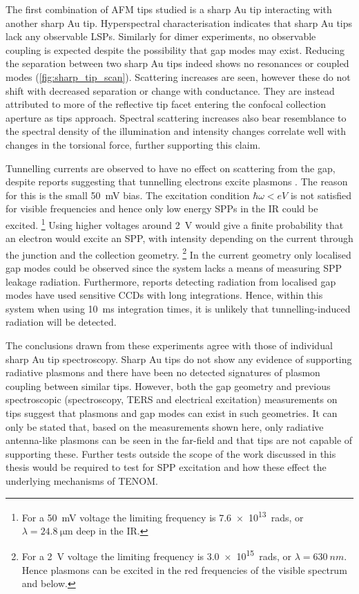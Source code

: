 \documentclass[a4paper]{article}
\begin{document}
The first combination of AFM tips studied is a sharp Au tip interacting with another sharp Au tip. Hyperspectral characterisation indicates that sharp Au tips lack any observable LSPs. Similarly for dimer experiments, no observable coupling is expected despite the possibility that gap modes may exist. Reducing the separation between two sharp Au tips indeed shows no resonances or coupled modes (\autoref{fig:sharp_tip_scan}). Scattering increases are seen, however these do not shift with decreased separation or change with conductance. They are instead attributed to more of the reflective tip facet entering the confocal collection aperture as tips approach. Spectral scattering increases also bear resemblance to the spectral density of the illumination and intensity changes correlate well with changes in the torsional force, further supporting this claim.

Tunnelling currents are observed to have no effect on scattering from the gap, despite reports suggesting that tunnelling electrons excite plasmons \cite{lambe1976, berndt1991, bharadwaj2011, wang2011, divitt2013, ye2014}. The reason for this is the small \SI{50}{mV} bias. The excitation condition $\hbar\omega<eV$ is not satisfied for visible frequencies and hence only low energy SPPs in the IR could be excited.%
\footnote{For a \SI{50}{mV} voltage the limiting frequency is \SI{7.6e13}{rads}, or $\lambda=\SI{24.8}{\micro\metre}$ deep in the IR.}
Using higher voltages around \SI{2}{V} would give a finite probability that an electron would excite an SPP, with intensity depending on the current through the junction and the collection geometry.%
\footnote{For a \SI{2}{V} voltage the limiting frequency is \SI{3.0e15}{rads}, or $\lambda=\SI{630}{nm}$. Hence plasmons can be excited in the red frequencies of the visible spectrum and below.}
In the current geometry only localised gap modes could be observed since the system lacks a means of measuring SPP leakage radiation. Furthermore, reports detecting radiation from localised gap modes have used sensitive CCDs with long integrations. Hence, within this system when using \SI{10}{ms} integration times, it is unlikely that tunnelling-induced radiation will be detected.

The conclusions drawn from these experiments agree with those of individual sharp Au tip spectroscopy. Sharp Au tips do not show any evidence of supporting radiative plasmons and there have been no detected signatures of plasmon coupling between similar tips. However, both the gap geometry and previous spectroscopic (spectroscopy, TERS and electrical excitation) measurements on tips suggest that plasmons and gap modes can exist in such geometries. It can only be stated that, based on the measurements shown here, only radiative antenna-like plasmons can be seen in the far-field and that tips are not capable of supporting these. Further tests outside the scope of the work discussed in this thesis would be required to test for SPP excitation and how these effect the underlying mechanisms of TENOM.
\end{document}
